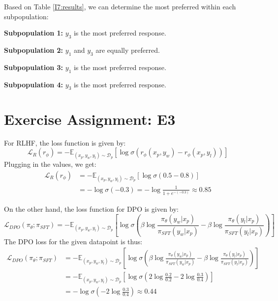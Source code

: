 \documentclass{article}
\begin{document}
Based on Table \ref{I7:results}, we can determine the most preferred within each subpopulation: 
\begin{arrowlist}
    \item \textbf{Subpopulation 1:} $y_3$ is the most preferred response.
    \item \textbf{Subpopulation 2:} $y_1$ and $y_3$ are equally preferred.
    \item \textbf{Subpopulation 3:} $y_1$ is the most preferred response.
    \item \textbf{Subpopulation 4:} $y_3$ is the most preferred response.
\end{arrowlist}

\section{Exercise Assignment: E3}\label{sec:e3}

For RLHF, the loss function is given by:
\begin{equation}\label{eq:rlhf}
    \mathcal{L}_R(r_\phi) = -\mathbb{E}_{(x_p,y_w,y_l) \sim \mathcal{D}_p}\left[\log \sigma(r_\phi(x_p,y_w) - r_\phi(x_p,y_l))\right]
\end{equation}
Plugging in the values, we get:
\begin{align*}
    \mathcal{L}_R(r_\phi) & = -\mathbb{E}_{(x_p,y_w,y_l) \sim \mathcal{D}_p}\left[\log \sigma(0.5 - 0.8)\right] \\ &= -\log \sigma(-0.3) = -\log \frac{1}{1 + e^{-(-0.3)}} \approx 0.85
\end{align*}

On the other hand, the loss function for DPO is given by:
\begin{equation}\label{eq:dpo}
    \mathcal{L}_{DPO}(\pi_\theta; \pi_{SFT}) = -\mathbb{E}_{(x_p,y_w,y_l) \sim \mathcal{D}_p}\left[\log \sigma\left(\beta\log\frac{\pi_\theta(y_w|x_p)}{\pi_{SFT}(y_w|x_p)} - \beta\log\frac{\pi_\theta(y_l|x_p)}{\pi_{SFT}(y_l|x_p)}\right)\right]
\end{equation}
The DPO loss for the given datapoint is thus:
\begin{align*}
    \mathcal{L}_{DPO}(\pi_\theta; \pi_{SFT}) & = -\mathbb{E}_{(x_p,y_w,y_l) \sim \mathcal{D}_p}\left[\log \sigma\left(\beta\log\frac{\pi_\theta(y_w|x_p)}{\pi_{SFT}(y_w|x_p)} - \beta\log\frac{\pi_\theta(y_l|x_p)}{\pi_{SFT}(y_l|x_p)}\right)\right] \\ &= -\mathbb{E}_{(x_p,y_w,y_l) \sim \mathcal{D}_p}\left[\log \sigma\left(2\log\frac{0.2}{0.2} - 2\log\frac{0.3}{0.4}\right)\right] \\ &= -\log \sigma\left(-2\log\frac{0.3}{0.4}\right)  \approx 0.44
\end{align*}
\end{document}
